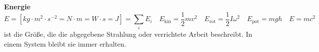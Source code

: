 \documentclass{article}
\begin{document}
\centering\Huge
\textbf{Energie} 
\[ 
        E=\left[kg\cdot m^2\cdot s ^{-2}=N\cdot m=W\cdot s=J\right]=\sum_{i}^{}E_i\quad E_{\text{kin}}=\dfrac{1}{2}mv^2\quad E_{\text{rot}}=\dfrac{1}{2}I\omega ^2\quad E_{\text{pot}}=mgh\quad E=mc ^2
\] 
ist die Größe, die die abgegebene Strahlung oder verrichtete Arbeit beschreibt. In einem System bleibt sie immer erhalten.
\end{document}
